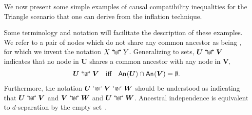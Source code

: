 
\color{black} 

We now present some simple examples of causal compatibility inequalities for the Triangle scenario that one can derive from the inflation technique. 

Some terminology and notation will facilitate the description of these examples.
We refer to a pair of nodes which do not share any common ancestor as being , for which we invent the notation $X\aindep Y$. Generalizing to sets, $\bm{U}\aindep \bm{V}$ indicates that no node in $\bm{U}$ shares a common ancestor with any node in $\bm{V}$, 
\begin{align}
\bm{U}\aindep \bm{V} \quad \text{iff} \quad \An{\bm{U}}\cap\An{\bm{V}}=\emptyset.
\end{align}
Furthermore, the notation ${\bm{U}\aindep \bm{V}\aindep \bm{W}}$ should be understood as indicating that $\bm{U}\aindep \bm{V}$ and $\bm{V}\aindep \bm{W}$ and $\bm{U}\aindep \bm{W}$.
Ancestral independence is equivalent to $d$-separation by the empty set~\cite{pearl2009causality,spirtes2011causation,studeny2005probabilistic,koller2009probabilistic}. 


\smallskip\nobreak

